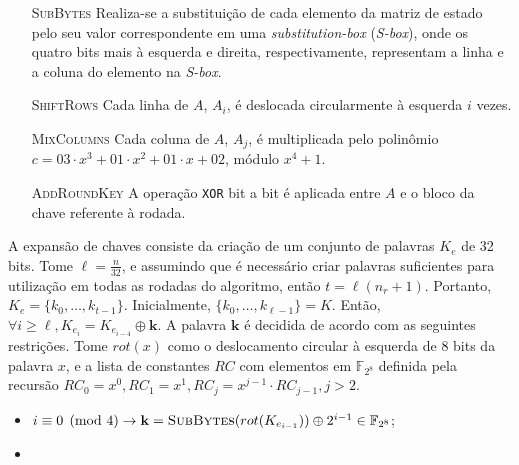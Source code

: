 \documentclass{article}
\begin{document}
\begin{enumerate}

    \item[\textsc{SubBytes}] Realiza-se a substituição de cada elemento da matriz de estado
        pelo seu valor correspondente em uma \emph{substitution-box} (\emph{S-box}), onde os quatro bits mais à esquerda e direita, respectivamente, representam a linha e a coluna do elemento na \emph{S-box}.

    \item[\textsc{ShiftRows}] Cada linha de $A$, $A_i$, é deslocada circularmente à esquerda     $i$ vezes.

    \item[\textsc{MixColumns}] Cada coluna de $A$, $A_j$, é multiplicada pelo polinômio
        $c = 03 \cdot x^{3} + 01 \cdot x^{2} + 01 \cdot x + 02$, módulo $x^{4} + 1$.

    \item[\textsc{AddRoundKey}] A operação \texttt{XOR} bit a bit é aplicada entre $A$ e o
        bloco da chave referente à rodada.

\end{enumerate}

A expansão de chaves consiste da criação de um conjunto de palavras $K_e$ de 32 bits.
Tome $\ell = \frac{n}{32}$, e assumindo que é necessário criar palavras suficientes para utilização em todas as rodadas do algoritmo, então $t = \ell(n_r + 1)$.
Portanto, $K_e = \{k_0, \dots, k_{t - 1}\}$. Inicialmente, $\{k_0, \dots, k_{\ell - 1}\} = K$.
Então, $\forall i \geq \ell, K_{e_{i}} = K_{e_{i-4}} \oplus \mathbf{k}$. A palavra $\mathbf{k}$ é decidida de acordo com as seguintes restrições. Tome $rot(x)$ como o deslocamento circular à esquerda de 8 bits da palavra $x$, e a lista de constantes $RC$ com elementos em $\mathbb{F}_{2^{8}}$ definida pela recursão $RC_0 = x^0, RC_1 = x^1, RC_j = x^{j-1} \cdot RC_{j-1}, j > 2$.

\begin{itemize}
    \item $i \equiv 0\pmod{4} \rightarrow \mathbf{k} = \textsc{SubBytes}(rot(K_{e_{i - 1}})) \oplus 2^{i-1} \in \mathbb{F}_{2^8}$;
    \item 
\end{itemize}
\end{document}

